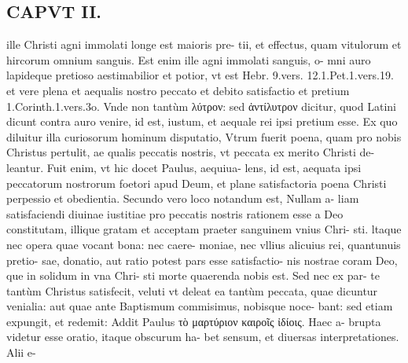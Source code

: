 \documentclass{article}
\begin{document}
\begin{pages}
\section*{CAPVT II. }
\marginpar{[ p.61 ]}\pstart ille Christi agni immolati longe est maioris pre- tii, et effectus, quam vitulorum et hircorum omnium sanguis. Est enim ille agni immolati sanguis, o- mni auro lapideque pretioso aestimabilior et potior, vt est Hebr. 9.vers. 12.1.Pet.1.vers.19. et vere plena et aequalis nostro peccato et debito satisfactio et pretium 1.Corinth.1.vers.3o. Vnde non tantùm λύτρον: sed ἀντίλυτρον dicitur, quod Latini dicunt contra auro venire, id est, iustum, et aequale rei ipsi pretium esse. Ex quo diluitur illa curiosorum hominum disputatio, Vtrum fuerit poena, quam pro nobis Christus pertulit, ae qualis peccatis nostris, vt peccata ex merito Christi de- leantur. Fuit enim, vt hic docet Paulus, aequiua- lens, id est, aequata ipsi peccatorum nostrorum foetori apud Deum, et plane satisfactoria poena Christi perpessio et obedientia.  \pend\pstart Secundo vero loco notandum est, Nullam a- liam satisfaciendi diuinae iustitiae pro peccatis nostris rationem esse a Deo constitutam, illique gratam et acceptam praeter sanguinem vnius Chri- sti. ltaque nec opera quae vocant bona: nec caere- moniae, nec vllius alicuius rei, quantunuis pretio- sae, donatio, aut ratio potest pars esse satisfactio- nis nostrae coram Deo, que in solidum in vna Chri- sti morte quaerenda nobis est. Sed nec ex par- te tantùm Christus satisfecit, veluti vt deleat ea tantùm peccata, quae dicuntur venialia: aut quae ante Baptismum commisimus, nobisque noce- bant: sed etiam expungit, et redemit:  \pend\pstart Addit Paulus τὸ μαρτύριον καιροῖς ἰδίοις. Haec a- brupta videtur esse oratio, itaque obscurum ha- bet sensum, et diuersas interpretationes. Alii e-  \pend

\end{pages}
\end{document}
